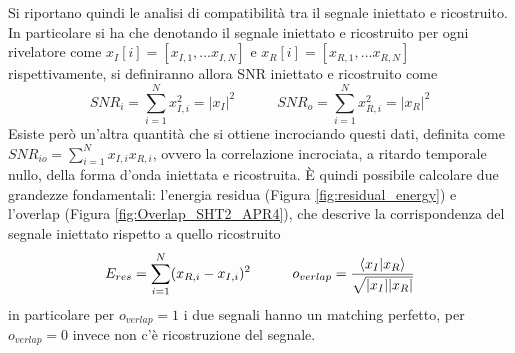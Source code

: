 Si riportano quindi le analisi di compatibilità tra il segnale iniettato e ricostruito. In particolare si ha che denotando il segnale iniettato e ricostruito per ogni rivelatore come $x_{I}[i]= [x_{I,1}, \dots x_{I,N}]$ e $x_{R}[i]= [x_{R,1}, \dots x_{R,N}]$ rispettivamente, si definiranno allora SNR iniettato e ricostruito come
\begin{equation}
SNR_i = \sum_{i=1}^{N}x_{I, i}^2 = |x_{I}|^2 \quad\quad\quad SNR_o = \sum_{i=1}^{N}x_{R, i}^2 = |x_{R}|^2
\label{eqn:iSNR_oSNR}
\end{equation} 
Esiste però un'altra quantità che si ottiene incrociando questi dati, definita come $SNR_{io} = \sum_{i=1}^{N}x_{I, i}x_{R, i}$, ovvero la correlazione incrociata, a ritardo temporale nullo, della forma d'onda iniettata e ricostruita. È quindi possibile calcolare due grandezze fondamentali: l'energia residua (Figura \ref{fig:residual_energy}) e l'overlap (Figura \ref{fig:Overlap_SHT2_APR4}), che descrive la corrispondenza del segnale iniettato rispetto a quello ricostruito
\begin{equation}
E_{res}= \sum_{i=1}^{N}(x_{R, i}-x_{I, i})^2%
\quad\quad\quad
o_{verlap} = \frac{\braket{x_I}{x_R}}{\sqrt{|x_I||x_R|}}%
\end{equation}
in particolare per $o_{verlap}=1$ i due segnali hanno un matching perfetto, per $o_{verlap}=0$ invece non c'è ricostruzione del segnale.

